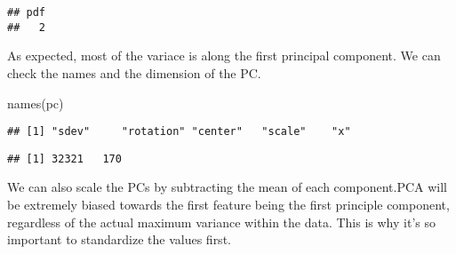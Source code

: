 \documentclass[
]{article}
\newenvironment{Shaded}{\begin{snugshade}}{\end{snugshade}}
\newcommand{\AttributeTok}[1]{\textcolor[rgb]{0.77,0.63,0.00}{#1}}
\newcommand{\CommentTok}[1]{\textcolor[rgb]{0.56,0.35,0.01}{\textit{#1}}}
\newcommand{\ConstantTok}[1]{\textcolor[rgb]{0.00,0.00,0.00}{#1}}
\newcommand{\DecValTok}[1]{\textcolor[rgb]{0.00,0.00,0.81}{#1}}
\newcommand{\FunctionTok}[1]{\textcolor[rgb]{0.00,0.00,0.00}{#1}}
\newcommand{\NormalTok}[1]{#1}
\newcommand{\OtherTok}[1]{\textcolor[rgb]{0.56,0.35,0.01}{#1}}
\newcommand{\SpecialCharTok}[1]{\textcolor[rgb]{0.00,0.00,0.00}{#1}}
\newcommand{\StringTok}[1]{\textcolor[rgb]{0.31,0.60,0.02}{#1}}
\begin{document}
\begin{verbatim}
## pdf 
##   2
\end{verbatim}

As expected, most of the variace is along the first principal component.
We can check the names and the dimension of the PC.

\begin{Shaded}
\begin{Highlighting}[]
\FunctionTok{names}\NormalTok{(pc)}
\end{Highlighting}
\end{Shaded}

\begin{verbatim}
## [1] "sdev"     "rotation" "center"   "scale"    "x"
\end{verbatim}

\begin{Shaded}
\end{Shaded}

\begin{verbatim}
## [1] 32321   170
\end{verbatim}

\begin{Shaded}
\end{Shaded}

We can also scale the PCs by subtracting the mean of each component.PCA
will be extremely biased towards the first feature being the first
principle component, regardless of the actual maximum variance within
the data. This is why it's so important to standardize the values first.

\begin{Shaded}
\end{Shaded}
\end{document}
